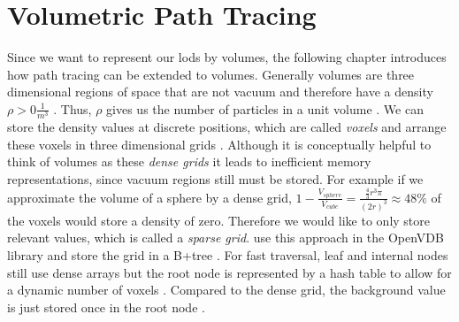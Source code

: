 \section{Volumetric Path Tracing}
Since we want to represent our \acsp{lod} by volumes, the following chapter introduces how path tracing can be extended to volumes.
Generally volumes are three dimensional regions of space that are not vacuum and therefore have a density $\rho > 0 \frac{1}{m^3}$ \cite{pbr}.
Thus, $\rho$ gives us the number of particles in a unit volume \cite{novak_overview}.
We can store the density values at discrete positions, which are called \textit{voxels} and arrange these voxels in three dimensional grids \cite{pbr}.
Although it is conceptually helpful to think of volumes as these \textit{dense grids} it leads to inefficient memory representations, since vacuum regions still must be stored.
For example if we approximate the volume of a sphere by a dense grid, $1 - \frac{V_{sphere}}{V_{cube}} = \frac{\frac{4}{3}r^3\pi}{(2r)^3}\approx 48\%$ of the voxels would store a density of zero.
Therefore we would like to only store relevant values, which is called a \textit{sparse grid}.
\citeauthor{museth_vdb} use this approach in the OpenVDB library and store the grid in a B+tree \cite{museth_vdb}.
For fast traversal, leaf and internal nodes still use dense arrays but the root node is represented by a hash table to allow for a dynamic number of voxels \cite{museth_vdb}.
Compared to the dense grid, the background value is just stored once in the root node \cite{museth_vdb}.

